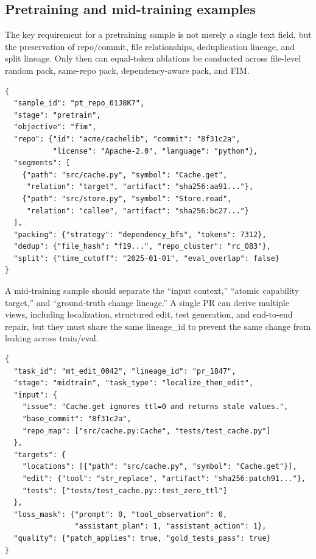 \documentclass[10pt,a4paper,UTF8,fontset=none]{ctexart}
\newcommand{\ident}[1]{{\rmfamily #1}}
\begin{document}
\subsection{Pretraining and mid-training examples}

The key requirement for a pretraining sample is not merely a single \ident{text} field, but the preservation of repo/commit, file relationships, deduplication lineage, and split lineage. Only then can equal-token ablations be conducted across file-level random pack, same-repo pack, dependency-aware pack, and FIM.

\begin{lstlisting}[style=codeblock,caption={Repo-level pretraining/FIM example},label={lst:pretrain-sample}]
{
  "sample_id": "pt_repo_01J8K7",
  "stage": "pretrain",
  "objective": "fim",
  "repo": {"id": "acme/cachelib", "commit": "8f31c2a",
           "license": "Apache-2.0", "language": "python"},
  "segments": [
    {"path": "src/cache.py", "symbol": "Cache.get",
     "relation": "target", "artifact": "sha256:aa91..."},
    {"path": "src/store.py", "symbol": "Store.read",
     "relation": "callee", "artifact": "sha256:bc27..."}
  ],
  "packing": {"strategy": "dependency_bfs", "tokens": 7312},
  "dedup": {"file_hash": "f19...", "repo_cluster": "rc_083"},
  "split": {"time_cutoff": "2025-01-01", "eval_overlap": false}
}
\end{lstlisting}

A mid-training sample should separate the “input context,” “atomic capability target,” and “ground-truth change lineage.” A single PR can derive multiple views, including localization, structured edit, test generation, and end-to-end repair, but they must share the same \ident{lineage\_id} to prevent the same change from leaking across train/eval.

\begin{lstlisting}[style=codeblock,caption={Mid-training atomic task derived from a PR/Issue},label={lst:midtrain-sample}]
{
  "task_id": "mt_edit_0042", "lineage_id": "pr_1847",
  "stage": "midtrain", "task_type": "localize_then_edit",
  "input": {
    "issue": "Cache.get ignores ttl=0 and returns stale values.",
    "base_commit": "8f31c2a",
    "repo_map": ["src/cache.py:Cache", "tests/test_cache.py"]
  },
  "targets": {
    "locations": [{"path": "src/cache.py", "symbol": "Cache.get"}],
    "edit": {"tool": "str_replace", "artifact": "sha256:patch91..."},
    "tests": ["tests/test_cache.py::test_zero_ttl"]
  },
  "loss_mask": {"prompt": 0, "tool_observation": 0,
                "assistant_plan": 1, "assistant_action": 1},
  "quality": {"patch_applies": true, "gold_tests_pass": true}
}
\end{lstlisting}
\end{document}
